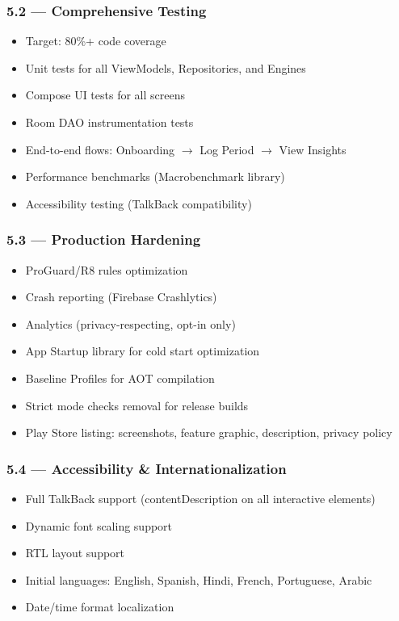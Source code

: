 \documentclass[12pt,a4paper]{article}
\begin{document}
\subsubsection{5.2 — Comprehensive Testing}
\begin{itemize}[leftmargin=1.5em]
  \item Target: 80\%+ code coverage
  \item Unit tests for all ViewModels, Repositories, and Engines
  \item Compose UI tests for all screens
  \item Room DAO instrumentation tests
  \item End-to-end flows: Onboarding $\rightarrow$ Log Period $\rightarrow$ View Insights
  \item Performance benchmarks (Macrobenchmark library)
  \item Accessibility testing (TalkBack compatibility)
\end{itemize}

\subsubsection{5.3 — Production Hardening}
\begin{itemize}[leftmargin=1.5em]
  \item ProGuard/R8 rules optimization
  \item Crash reporting (Firebase Crashlytics)
  \item Analytics (privacy-respecting, opt-in only)
  \item App Startup library for cold start optimization
  \item Baseline Profiles for AOT compilation
  \item Strict mode checks removal for release builds
  \item Play Store listing: screenshots, feature graphic, description, privacy policy
\end{itemize}

\subsubsection{5.4 — Accessibility \& Internationalization}
\begin{itemize}[leftmargin=1.5em]
  \item Full TalkBack support (contentDescription on all interactive elements)
  \item Dynamic font scaling support
  \item RTL layout support
  \item Initial languages: English, Spanish, Hindi, French, Portuguese, Arabic
  \item Date/time format localization
\end{itemize}
\end{document}

